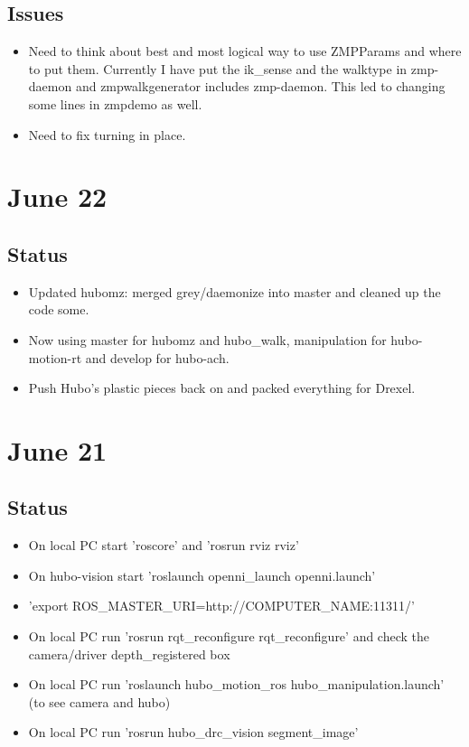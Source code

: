 \documentclass[letterpaper, 10 pt]{report}
\begin{document}
\subsection*{Issues}
\begin{itemize}
\item Need to think about best and most logical way to use ZMPParams and where to put them. Currently I have put the ik\_sense and the walktype in zmp-daemon and zmpwalkgenerator includes zmp-daemon. This led to changing some lines in zmpdemo as well.
\item Need to fix turning in place.
\end{itemize}

\section*{June 22}
\subsection*{Status}
\begin{itemize}
\item Updated hubomz: merged grey/daemonize into master and cleaned up the code some.
\item Now using master for hubomz and hubo\_walk, manipulation for hubo-motion-rt and
develop for hubo-ach.
\item Push Hubo's plastic pieces back on and packed everything for Drexel.
\end{itemize}

\section*{June 21}
\subsection*{Status}
\begin{itemize}
\item On local PC start 'roscore' and 'rosrun rviz rviz'
\item On hubo-vision start 'roslaunch openni\_launch openni.launch'
\item 'export ROS\_MASTER\_URI=http://COMPUTER\_NAME:11311/'
\item On local PC run 'rosrun rqt\_reconfigure rqt\_reconfigure' and check the camera/driver depth\_registered box
\item On local PC run 'roslaunch hubo\_motion\_ros hubo\_manipulation.launch' (to see camera and hubo)
\item On local PC run 'rosrun hubo\_drc\_vision segment\_image'
\end{itemize}
\end{document}

